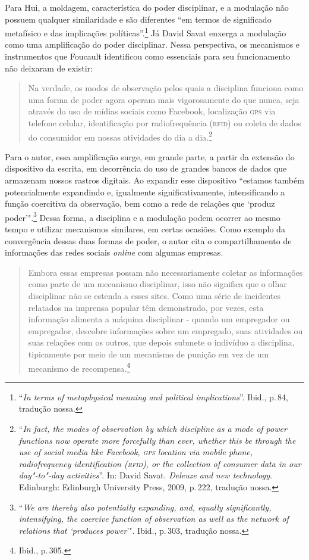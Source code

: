 Para Hui, a moldagem, característica do poder disciplinar, e a modulação não
possuem qualquer similaridade e são diferentes ``em termos de
significado metafísico e das implicações políticas''.\footnote{``\emph{In terms
  of metaphysical meaning and political implications}''. Ibid., p.\,84, tradução
nossa.} Já David Savat enxerga a modulação como uma amplificação do poder disciplinar. Nessa perspectiva, os mecanismos e instrumentos que Foucault identificou como
essenciais para seu funcionamento não deixaram de existir:

\begin{quote}
Na verdade, os modos de observação pelos quais a disciplina funciona
como uma forma de poder agora operam mais vigorosamente do que nunca,
seja através do uso de mídias sociais como Facebook, localização \textsc{gps} via
telefone celular, identificação por radiofrequência (\textsc{rfid}) ou coleta de
dados do consumidor em nossas atividades do dia a dia.\footnote{``\emph{In
  fact, the modes of observation by which discipline as a mode of power
  functions now operate more forcefully than ever, whether this be
  through the use of social media like Facebook, \textsc{gps} location via mobile
  phone, radiofrequency identification (\textsc{rfid}), or the collection of
  consumer data in our day"-to"-day activities}''. In: David Savat. \emph{Deleuze and new technology}. Edinburgh: Edinburgh University Press, 2009, p.\,222, tradução nossa.} 
\end{quote}

Para o autor, essa amplificação surge, em grande parte, a partir da
extensão do dispositivo da escrita, em decorrência do uso de grandes
bancos de dados que armazenam nossos rastros digitais. Ao expandir esse
dispositivo ``estamos também potencialmente expandindo e, igualmente
significativamente, intensificando a função coercitiva da observação,
bem como a rede de relações que `produz poder'".\footnote{``\emph{We are
  thereby also potentially expanding, and, equally significantly,
  intensifying, the coercive function of observation as well as the
  network of relations that `produces power}'". Ibid., p.\,303, tradução nossa.}
Dessa forma, a disciplina e a modulação podem ocorrer ao mesmo tempo e
utilizar mecanismos similares, em certas ocasiões. Como exemplo da
convergência dessas duas formas de poder, o autor cita o
compartilhamento de informações das redes sociais \emph{online} com algumas
empresas.

\begin{quote}
Embora essas empresas possam não necessariamente coletar as informações
como parte de um mecanismo disciplinar, isso não significa que o olhar
disciplinar não se estenda a esses sites. Como uma série de incidentes
relatados na imprensa popular têm demonstrado, por vezes, esta
informação alimenta a máquina disciplinar - quando um empregador ou
empregador, descobre informações sobre um empregado, suas atividades ou
suas relações com os outros, que depois submete o indivíduo a
disciplina, tipicamente por meio de um mecanismo de punição em vez de um
mecanismo de recompensa.\footnote{Ibid., p.\,305.}
\end{quote}

